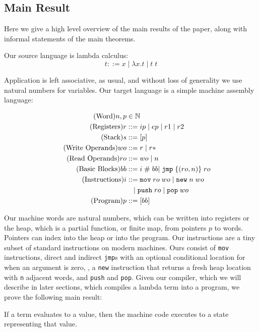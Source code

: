\subsection{Main Result}
Here we give a high level overview of the main results of the paper, along with
informal statements of the main theorems.

Our source language is lambda calculus: 
$$ t ::= x \; | \; \lambda x.t \; | \; t \; t $$

Application is left associative, as usual, and without loss of generality we
use natural numbers for variables. Our target language is a simple machine
assembly language:

\begin{align}
  \tag{Word}   n, p &\in \mathbb{N} \\
  \tag{Registers} r &::= ip \; | \; ep \; | \; r1 \; | \; r2  \\
  \tag{Stack}     s &::= [p] \\
  \tag{Write Operands}  wo &::= r \; | \; r* \\
  \tag{Read Operands}  ro &::= wo \; | \; n \\
  \tag{Basic Blocks} bb &::= i \; \# \; bb
                       | \; \texttt{jmp} \; \{(ro, n)\} \; ro \;  \\
  \tag{Instructions} i &::= \texttt{mov} \; ro \; wo \; 
                       | \; \texttt{new} \; n \; wo \; \\
  \notag       & \quad | \; \texttt{push} \; ro \; 
                       | \; \texttt{pop} \; wo \\
  \tag{Program}   p &::= [bb]
\end{align}

Our machine words are natural numbers, which can be written into registers or
the heap, which is a partial function, or finite map, from pointers $p$ to
words. Pointers can index into the heap or into the program. Our instructions
are a tiny subset of standard instructions on modern machines. Ours consist of
\texttt{mov} instructions, direct and indirect \texttt{jmp}s with an optional
conditional location for when an argument is zero, , a \texttt{new} instruction
that returns a fresh heap location with \texttt{n} adjacent words, and
\texttt{push} and \texttt{pop}. Given our compiler, which we will describe in
later sections, which compiles a lambda term into a program, we prove the
following main result:

\begin{theorem}
If a term evaluates to a value, then the machine code executes to a state
representing that value. 
\end{theorem}

